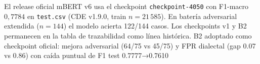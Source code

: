 El release oficial mBERT v6 usa el checkpoint \texttt{checkpoint-4050} con F1-macro $0{,}7784$ en \texttt{test.csv} (CDE v1.9.0, train $n=21\,585$). En batería adversarial extendida ($n=144$) el modelo acierta 122/144 casos. Los checkpoints v1 y B2 permanecen en la tabla de trazabilidad como línea histórica. B2 adoptado como checkpoint oficial: mejora adversarial (64/75 vs 45/75) y FPR dialectal (gap 0.07 vs 0.86) con caída puntual de F1 test 0.7777→0.7610
